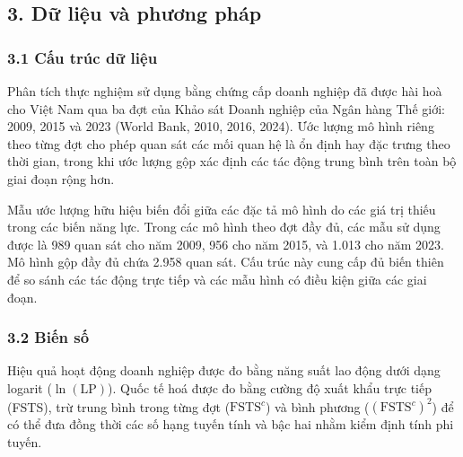 \documentclass[12pt,a4paper]{article}
\begin{document}
\hypertarget{3-dux1eef-liux1ec7u-vuxe0-phux1b0ux1a1ng-phuxe1p}{%
\subsection{3. Dữ liệu và phương
pháp}\label{3-dux1eef-liux1ec7u-vuxe0-phux1b0ux1a1ng-phuxe1p}}

\hypertarget{31-cux1ea5u-truxfac-dux1eef-liux1ec7u}{%
\subsubsection{3.1 Cấu trúc dữ
liệu}\label{31-cux1ea5u-truxfac-dux1eef-liux1ec7u}}

Phân tích thực nghiệm sử dụng bằng chứng cấp doanh nghiệp đã được hài
hoà cho Việt Nam qua ba đợt của Khảo sát Doanh nghiệp của Ngân hàng Thế
giới: 2009, 2015 và 2023 (World Bank, 2010, 2016, 2024). Ước lượng mô
hình riêng theo từng đợt cho phép quan sát các mối quan hệ là ổn định
hay đặc trưng theo thời gian, trong khi ước lượng gộp xác định các tác
động trung bình trên toàn bộ giai đoạn rộng hơn.

Mẫu ước lượng hữu hiệu biến đổi giữa các đặc tả mô hình do các giá trị
thiếu trong các biến năng lực. Trong các mô hình theo đợt đầy đủ, các
mẫu sử dụng được là 989 quan sát cho năm 2009, 956 cho năm 2015, và
1.013 cho năm 2023. Mô hình gộp đầy đủ chứa 2.958 quan sát. Cấu trúc này
cung cấp đủ biến thiên để so sánh các tác động trực tiếp và các mẫu hình
có điều kiện giữa các giai đoạn.

\hypertarget{32-biux1ebfn-sux1ed1}{%
\subsubsection{3.2 Biến số}\label{32-biux1ebfn-sux1ed1}}

Hiệu quả hoạt động doanh nghiệp được đo bằng năng suất lao động dưới
dạng logarit (\(\ln(\mathrm{LP})\)). Quốc tế hoá được đo bằng cường độ
xuất khẩu trực tiếp (FSTS), trừ trung bình trong từng đợt
(\(\mathrm{FSTS}^{c}\)) và bình phương (\((\mathrm{FSTS}^{c})^2\)) để có
thể đưa đồng thời các số hạng tuyến tính và bậc hai nhằm kiểm định tính
phi tuyến.
\end{document}
